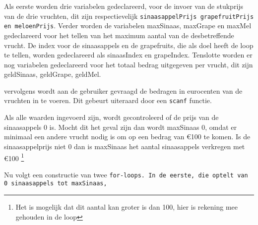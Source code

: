 Als eerste worden drie variabelen gedeclareerd, voor de invoer van de stukprijs van de drie vruchten, dit zijn respectievelijk {\tt sinaasappelPrijs grapefruitPrijs en meloenPrijs}.
Verder worden de variabelen maxSinaas, maxGrape en maxMel gedeclareerd voor het tellen van het maximum aantal van de desbetreffende vrucht.
De index voor de sinaasappels en de grapefruits, die als doel heeft de loop te tellen, worden gedeclareerd als sinaasIndex en grapeIndex.
Tenslotte worden er nog variabelen gedeclareerd voor het totaal bedrag uitgegeven per vrucht, dit zijn geldSinaas, geldGrape, geldMel.

vervolgens wordt aan de gebruiker gevraagd de bedragen in eurocenten van de vruchten  in te voeren.
Dit gebeurt uiteraard door een {\tt scanf} functie.

Als alle waarden ingevoerd zijn, wordt gecontroleerd of de prijs van de sinaasappels 0 is.
Mocht dit het geval zijn dan wordt maxSinaas 0, omdat er minimaal een andere vrucht nodig is om op een bedrag van \euro100 te komen.
Is de sinaasappelprijs niet 0 dan is maxSinaas het aantal sinaasappels verkregen met \euro100 \footnote{Het is mogelijk dat dit aantal kan groter is dan 100, hier is rekening mee gehouden in de loop}

Nu volgt een constructie van twee \tt {for-loops}.
In de eerste, die optelt van 0 sinaasappels tot maxSinaas, 
